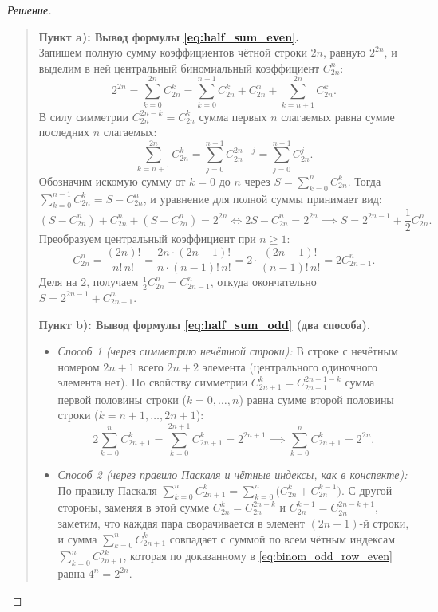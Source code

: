 \begin{proof}[Решение]~\\
    \begin{quote}
        \textbf{Пункт a): Вывод формулы \eqref{eq:half_sum_even}.}\\
        Запишем полную сумму коэффициентов чётной строки $2n$, равную 
        $2^{2n}$, и выделим в ней центральный биномиальный коэффициент 
        $C_{2n}^n$:
        \[
            2^{2n} = \sum_{k=0}^{2n} C_{2n}^k = 
            \sum_{k=0}^{n-1} C_{2n}^k + C_{2n}^n + \sum_{k=n+1}^{2n} C_{2n}^k.
        \]
        В силу симметрии $C_{2n}^{2n-k} = C_{2n}^k$ сумма первых $n$ 
        слагаемых равна сумме последних $n$ слагаемых:
        \[
            \sum_{k=n+1}^{2n} C_{2n}^k = \sum_{j=0}^{n-1} C_{2n}^{2n-j} = 
            \sum_{j=0}^{n-1} C_{2n}^j.
        \]
        Обозначим искомую сумму от $k = 0$ до $n$ через 
        $S = \sum_{k=0}^n C_{2n}^k$. Тогда $\sum_{k=0}^{n-1} C_{2n}^k = 
        S - C_{2n}^n$, и уравнение для полной суммы принимает вид:
        \[
            (S - C_{2n}^n) + C_{2n}^n + (S - C_{2n}^n) = 2^{2n} \iff 
            2S - C_{2n}^n = 2^{2n} \implies S = 2^{2n-1} + \frac{1}{2} C_{2n}^n.
        \]
        Преобразуем центральный коэффициент при $n \ge 1$:
        \[
            C_{2n}^n = \frac{(2n)!}{n! \, n!} = 
            \frac{2n \cdot (2n - 1)!}{n \cdot (n - 1)! \, n!} = 
            2 \cdot \frac{(2n - 1)!}{(n - 1)! \, n!} = 2 C_{2n-1}^n.
        \]
        Деля на $2$, получаем $\frac{1}{2} C_{2n}^n = C_{2n-1}^n$, откуда 
        окончательно $S = 2^{2n-1} + C_{2n-1}^n$.

        \textbf{Пункт b): Вывод формулы \eqref{eq:half_sum_odd} (два 
        способа).}
        \begin{itemize}
            \item \emph{Способ 1 (через симметрию нечётной строки):} 
            В строке с нечётным номером $2n + 1$ всего $2n + 2$ элемента 
            (центрального одиночного элемента нет). По свойству симметрии 
            $C_{2n+1}^k = C_{2n+1}^{2n+1-k}$ сумма первой половины строки 
            ($k = 0, \dots, n$) равна сумме второй половины строки 
            ($k = n + 1, \dots, 2n + 1$):
            \[
                2 \sum_{k=0}^{n} C_{2n+1}^k = \sum_{k=0}^{2n+1} C_{2n+1}^k = 
                2^{2n+1} \implies \sum_{k=0}^{n} C_{2n+1}^k = 2^{2n}.
            \]
            \item \emph{Способ 2 (через правило Паскаля и чётные индексы, 
            как в конспекте):} 
            По правилу Паскаля $\sum_{k=0}^n C_{2n+1}^k = 
            \sum_{k=0}^n \bigl(C_{2n}^k + C_{2n}^{k-1}\bigr)$. С другой 
            стороны, заменяя в этой сумме $C_{2n}^k = C_{2n}^{2n-k}$ и 
            $C_{2n}^{k-1} = C_{2n}^{2n-k+1}$, заметим, что каждая пара 
            сворачивается в элемент $(2n + 1)$-й строки, и сумма 
            $\sum_{k=0}^n C_{2n+1}^k$ совпадает с суммой по всем чётным 
            индексам $\sum_{k=0}^n C_{2n+1}^{2k}$, которая по доказанному 
            в \eqref{eq:binom_odd_row_even} равна $4^n = 2^{2n}$.
        \end{itemize}


\end{quote}
\end{proof}
